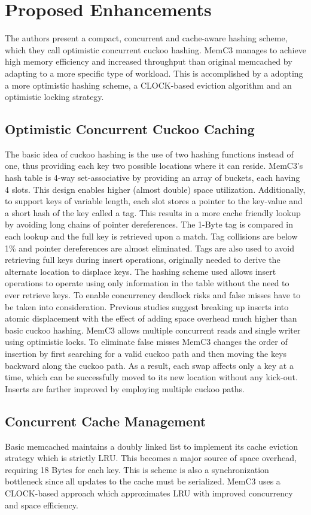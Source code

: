 \documentclass[letterpaper,twocolumn,10pt]{article}
\begin{document}
\section{Proposed Enhancements}

The authors present a compact, concurrent and cache-aware hashing scheme, which they call optimistic concurrent cuckoo hashing. MemC3 manages to achieve high memory efficiency and increased throughput than original memcached by adapting to a more specific type of workload. This is accomplished by a adopting a more optimistic hashing scheme, a CLOCK-based eviction algorithm and an optimistic locking strategy.

\subsection{Optimistic Concurrent Cuckoo Caching}
The basic idea of cuckoo hashing is the use of two hashing functions instead of one, thus providing each key two possible locations where it can reside. MemC3's hash table is 4-way set-associative by providing an array of buckets, each having 4 slots. This design enables higher (almost double) space utilization. 
Additionally, to support keys of variable length, each slot stores a pointer to the key-value and a short hash of the key called a tag. This results in a more cache friendly  lookup by avoiding long chains of pointer dereferences. The 1-Byte tag is compared in each lookup and the full key is retrieved upon a match. Tag collisions are below 1\% and pointer dereferences are almost eliminated.
Tags are also used to avoid retrieving full keys during insert operations, originally needed to derive the alternate location to displace keys. The hashing scheme used allows insert operations to operate using only information in the table without the need to ever retrieve keys.
To enable concurrency deadlock risks and false misses have to be taken into consideration.
Previous studies suggest breaking up inserts into atomic displacement with the effect of adding space overhead much higher than basic cuckoo hashing. MemC3 allows multiple concurrent reads and single writer using optimistic locks.
To eliminate false misses MemC3 changes the order of insertion by first searching for a valid cuckoo path and then moving the keys backward along the cuckoo path. As a result, each swap affects only a key at a time, which can be successfully moved to its new location without any kick-out. Inserts are farther improved by employing multiple cuckoo paths. 

\subsection{Concurrent Cache Management}
Basic memcached maintains a doubly linked list to implement its cache eviction strategy which is strictly LRU. This becomes a major source of space overhead, requiring 18 Bytes for each key. This is scheme is also a synchronization bottleneck since all updates to the cache must be serialized. MemC3 uses a CLOCK-based approach which approximates LRU with improved concurrency and space efficiency.


{\footnotesize 
}


\theendnotes
\end{document}
